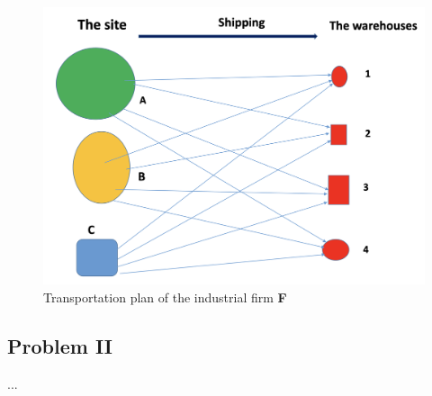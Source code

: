 \documentclass[a4paper]{article}
\begin{document}
	\begin{figure}[H]
		\centering
		\includegraphics[width=0.8\linewidth]{graphics/prob1_example.png}
		\caption{Transportation plan of the industrial firm \textbf{F}}
		\label{fig:problem1}
	\end{figure}
	
	\subsection{Problem II}
	...


\clearpage


\nocite{*}
\end{document}

